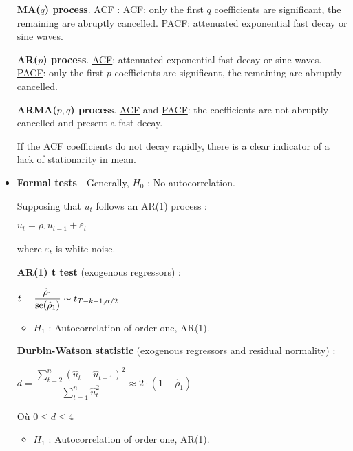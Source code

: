 \begin{f}[Detection]
\begin{itemize}[leftmargin=*]
	
	\textbf{MA($q$) process}. \underline{ACF} : \underline{ACF}: only the first $q$ coefficients are significant, the remaining are abruptly cancelled. \underline{PACF}: attenuated exponential fast decay or sine waves.
	
	\textbf{AR($p$) process}. \underline{ACF}: attenuated exponential fast decay or sine waves. \underline{PACF}: only the first $p$ coefficients are significant, the remaining are abruptly cancelled.

	
	\textbf{ARMA($p, q$) process}. \underline{ACF} and \underline{PACF}: the coefficients are not abruptly cancelled and present a fast decay.
	
	If the ACF coefficients do not decay rapidly, there is a clear indicator of a lack of stationarity in mean.
	
	\item \textbf{Formal tests} - Generally, $H_{0}$ : No autocorrelation.
	
	Supposing that $u_{t}$ follows an AR(1) process :
	
	\begin{center}
		$u_{t} = \rho_{1} u_{t - 1} + \varepsilon_{t}$
	\end{center}
	
	where $\varepsilon_{t}$ is white noise.
	
	\textbf{AR(1) t test} (exogenous regressors) :
	
	\begin{center}
		$t = \dfrac{\hat{\rho}_{1}}{\mathrm{se}(\hat{\rho}_{1})} \sim t_{T - k - 1, \alpha/2}$
	\end{center}
	
	\begin{itemize}[leftmargin=*]
		\item $H_{1}$ : Autocorrelation of order one, AR(1).
	\end{itemize}
	
	\textbf{Durbin-Watson statistic} (exogenous regressors and residual normality) :
	
	\begin{center}
		$d = \dfrac{\sum_{t=2}^{n} (\hat{u}_{t} - \hat{u}_{t - 1})^{2}}{\sum_{t=1}^{n} \hat{u}_{t}^{2}} \approx 2 \cdot (1 - \hat{\rho}_{1})$
	\end{center}
	
	Où $0 \leq d \leq 4$
	
	\begin{itemize}[leftmargin=*]
		\item $H_{1}$ : Autocorrelation of order one, AR(1).
	\end{itemize}
	

\end{itemize}
\end{f}
